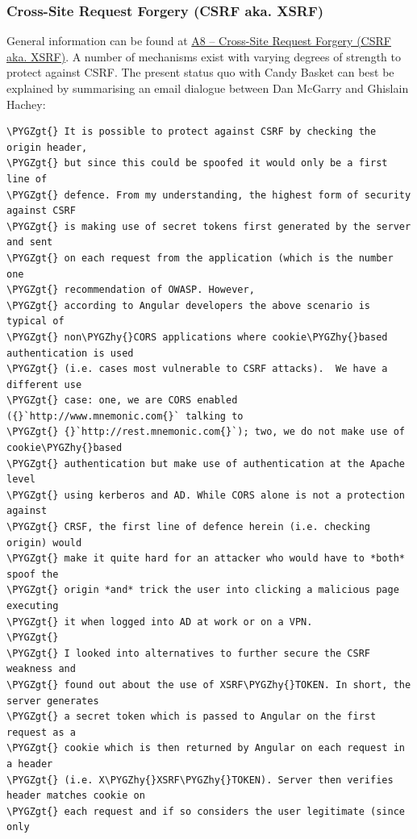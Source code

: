 \documentclass[letterpaper,10pt,english]{sphinxmanual}
\def\PYGZgt{\char`\>}
\def\PYGZhy{\char`\-}
\begin{document}
\subsubsection{Cross-Site Request Forgery (CSRF aka. XSRF)}
\label{developer-guide:cross-site-request-forgery-csrf-aka-xsrf}
General information can be found at \href{https://owasp.org/index.php/Top\_10\_2013-A8-Cross-Site\_Request\_Forgery\_\%28CSRF\%29}{A8 -- Cross-Site Request Forgery
(CSRF aka. XSRF)}.
A number of mechanisms exist with varying degrees of strength to
protect against CSRF. The present status quo with Candy Basket can
best be explained by summarising an email dialogue between Dan McGarry
and Ghislain Hachey:

\begin{Verbatim}[commandchars=\\\{\}]
\PYGZgt{} It is possible to protect against CSRF by checking the origin header,
\PYGZgt{} but since this could be spoofed it would only be a first line of
\PYGZgt{} defence. From my understanding, the highest form of security against CSRF
\PYGZgt{} is making use of secret tokens first generated by the server and sent
\PYGZgt{} on each request from the application (which is the number one
\PYGZgt{} recommendation of OWASP. However,
\PYGZgt{} according to Angular developers the above scenario is typical of
\PYGZgt{} non\PYGZhy{}CORS applications where cookie\PYGZhy{}based authentication is used
\PYGZgt{} (i.e. cases most vulnerable to CSRF attacks).  We have a different use
\PYGZgt{} case: one, we are CORS enabled ({}`http://www.mnemonic.com{}` talking to
\PYGZgt{} {}`http://rest.mnemonic.com{}`); two, we do not make use of cookie\PYGZhy{}based
\PYGZgt{} authentication but make use of authentication at the Apache level
\PYGZgt{} using kerberos and AD. While CORS alone is not a protection against
\PYGZgt{} CRSF, the first line of defence herein (i.e. checking origin) would
\PYGZgt{} make it quite hard for an attacker who would have to *both* spoof the
\PYGZgt{} origin *and* trick the user into clicking a malicious page executing
\PYGZgt{} it when logged into AD at work or on a VPN.
\PYGZgt{}
\PYGZgt{} I looked into alternatives to further secure the CSRF weakness and
\PYGZgt{} found out about the use of XSRF\PYGZhy{}TOKEN. In short, the server generates
\PYGZgt{} a secret token which is passed to Angular on the first request as a
\PYGZgt{} cookie which is then returned by Angular on each request in a header
\PYGZgt{} (i.e. X\PYGZhy{}XSRF\PYGZhy{}TOKEN). Server then verifies header matches cookie on
\PYGZgt{} each request and if so considers the user legitimate (since only

\end{Verbatim}
\end{document}
